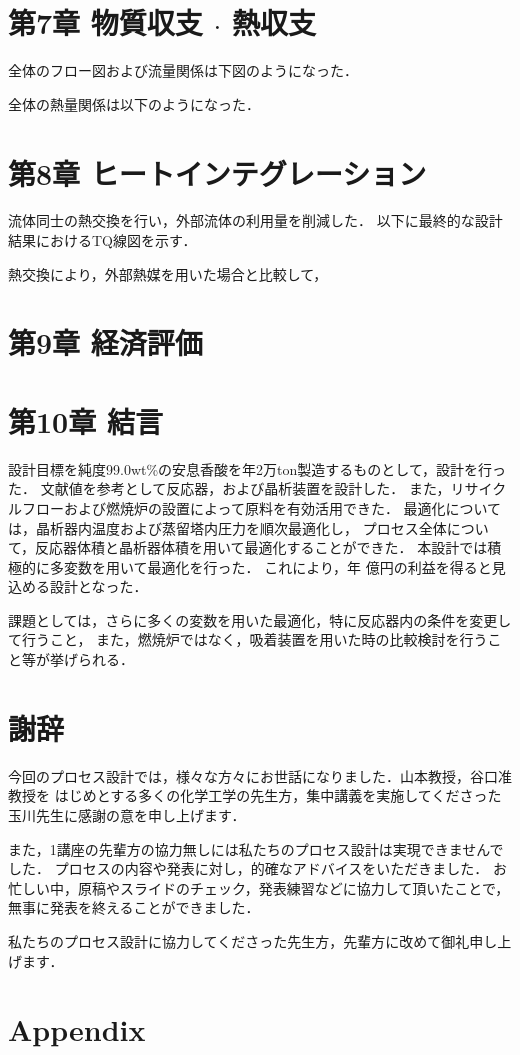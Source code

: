 \documentclass[a4j, titlepage]{jsarticle}
\begin{document}
\newpage
\section*{第7章 物質収支 $\cdot$ 熱収支}
全体のフロー図および流量関係は下図のようになった．

全体の熱量関係は以下のようになった．

\newpage
\section*{第8章 ヒートインテグレーション}
流体同士の熱交換を行い，外部流体の利用量を削減した．
以下に最終的な設計結果におけるTQ線図を示す．

熱交換により，外部熱媒を用いた場合と比較して，

\newpage
\section*{第9章 経済評価}

\newpage
\section*{第10章 結言}
設計目標を純度99.0wt\%の安息香酸を年2万ton製造するものとして，設計を行った．
文献値を参考として反応器，および晶析装置を設計した．
また，リサイクルフローおよび燃焼炉の設置によって原料を有効活用できた．
最適化については，晶析器内温度および蒸留塔内圧力を順次最適化し，
プロセス全体について，反応器体積と晶析器体積を用いて最適化することができた．
本設計では積極的に多変数を用いて最適化を行った．
これにより，年 億円の利益を得ると見込める設計となった．
\par
課題としては，さらに多くの変数を用いた最適化，特に反応器内の条件を変更して行うこと，
また，燃焼炉ではなく，吸着装置を用いた時の比較検討を行うこと等が挙げられる．

\newpage
\section*{謝辞}
今回のプロセス設計では，様々な方々にお世話になりました．山本教授，谷口准教授を
はじめとする多くの化学工学の先生方，集中講義を実施してくださった玉川先生に感謝の意を申し上げます．
\par
また，1講座の先輩方の協力無しには私たちのプロセス設計は実現できませんでした．
プロセスの内容や発表に対し，的確なアドバイスをいただきました．
お忙しい中，原稿やスライドのチェック，発表練習などに協力して頂いたことで，無事に発表を終えることができました．
\par
私たちのプロセス設計に協力してくださった先生方，先輩方に改めて御礼申し上げます．

\newpage


\newpage
\section*{Appendix}
\end{document}
